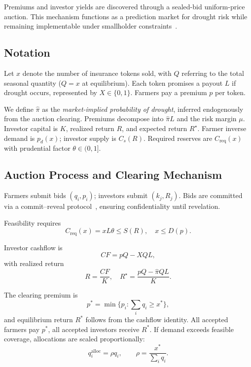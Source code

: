 \documentclass[11pt,a4paper]{article}
\begin{document}
        Premiums and investor yields are discovered through a sealed-bid uniform-price auction.
        This mechanism functions as a prediction market for drought risk while remaining implementable under smallholder constraints~\parencite{wilson1979auctions,ausubel2002demand}.

        \subsection{Notation}\label{subsec:notation}
        Let $x$ denote the number of insurance tokens sold, with $Q$ referring to the total seasonal quantity ($Q=x$ at equilibrium).
        Each token promises a payout $L$ if drought occurs, represented by $X \in \{0,1\}$.
        Farmers pay a premium $p$ per token.

        We define $\hat{\pi}$ as the \emph{market-implied probability of drought}, inferred endogenously from the auction clearing.
        Premiums decompose into $\hat{\pi}L$ and the risk margin $\mu$.
        Investor capital is $K$, realized return $R$, and expected return $R^\star$.
        Farmer inverse demand is $p_d(x)$; investor supply is $C_s(R)$.
        Required reserves are $C_{\mathrm{req}}(x)$ with prudential factor $\theta \in (0,1]$.

        \subsection{Auction Process and Clearing Mechanism}\label{subsec:auction-process-and-clearing-mechanism}
        Farmers submit bids $(q_i, p_i)$; investors submit $(k_j, R_j)$.
        Bids are committed via a commit--reveal protocol~\parencite{blum1983coinflipping,buterin2015commit,parkes2014mechanism}, ensuring confidentiality until revelation.

        Feasibility requires
        \[
            C_{\mathrm{req}}(x) = xL\theta \leq S(R), \quad x \leq D(p).
        \]

        Investor cashflow is
        \[
            CF = pQ - XQL,
        \]
        with realized return
        \[
            R = \frac{CF}{K}, \quad
            R^\star = \frac{pQ - \hat{\pi}QL}{K}.
        \]

        The clearing premium is
        \[
            p^\ast = \min\{p_i : \sum_i q_i \geq x^\ast\},
        \]
        and equilibrium return $R^\ast$ follows from the cashflow identity.
        All accepted farmers pay $p^\ast$, all accepted investors receive $R^\ast$.
        If demand exceeds feasible coverage, allocations are scaled proportionally:
        \[
            q_i^{\text{alloc}} = \rho q_i, \qquad \rho = \frac{x^\ast}{\sum_i q_i}.
        \]
\end{document}
